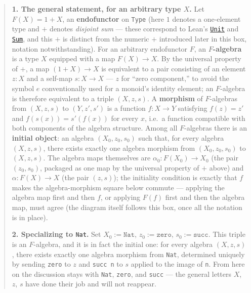 \begin{quote}
\textbf{1. The general statement, for an arbitrary type \(X\).} Let \(F(X) = 1 + X\), an \textbf{endofunctor} on \texttt{Type} (here \(1\) denotes a one-element type and \(+\) denotes \emph{disjoint sum} --- these correspond to Lean's \href{https://leanprover-community.github.io/mathlib4_docs/Init/Prelude.html\#Unit}{\texttt{Unit}} and \href{https://leanprover-community.github.io/mathlib4_docs/Init/Core.html\#Sum}{\texttt{Sum}}, and this \(+\) is distinct from the numeric \(+\) introduced later in this box, notation notwithstanding). For an arbitrary endofunctor \(F\), an \textbf{\(F\)-algebra} is a type \(X\) equipped with a map \(F(X) \to X\). By the universal property of \(+\), a map \((1 + X) \to X\) is equivalent to a pair consisting of an element \(z : X\) and a self-map \(s : X \to X\) --- \(z\) for ``zero component,'' to avoid the symbol \(e\) conventionally used for a monoid's identity element; an \(F\)-algebra is therefore equivalent to a triple \((X, z, s)\). A \textbf{morphism} of \(F\)-algebras from \((X, z, s)\) to \((Y, z', s')\) is a function \(f : X \to Y\) satisfying \(f(z) = z'\) and \(f(s(x)) = s'(f(x))\) for every \(x\), i.e.~a function compatible with both components of the algebra structure. Among all \(F\)-algebras there is an \textbf{initial object}: an algebra \((X_0, z_0, s_0)\) such that, for every algebra \((X, z, s)\), there exists exactly one algebra morphism from \((X_0, z_0, s_0)\) to \((X, z, s)\). The algebra maps themselves are \(\alpha_0 : F(X_0) \to X_0\) (the pair \((z_0, s_0)\), packaged as one map by the universal property of \(+\) above) and \(\alpha : F(X) \to X\) (the pair \((z, s)\)); the initiality condition is exactly that \(f\) makes the algebra-morphism square below commute --- applying the algebra map first and then \(f\), or applying \(F(f)\) first and then the algebra map, must agree (the diagram itself follows this box, once all the notation is in place).

\textbf{2. Specializing to \texttt{Nat}.} Set \(X_0 := \mathtt{Nat}\), \(z_0 := \mathtt{zero}\), \(s_0 := \mathtt{succ}\). This triple is an \(F\)-algebra, and it is in fact the initial one: for every algebra \((X, z, s)\), there exists exactly one algebra morphism from \texttt{Nat}, determined uniquely by sending \texttt{zero} to \(z\) and \texttt{succ n} to \(s\) applied to the image of \texttt{n}. From here on the discussion stays with \texttt{Nat}, \texttt{zero}, and \texttt{succ} --- the general letters \(X\), \(z\), \(s\) have done their job and will not reappear.


\end{quote}
